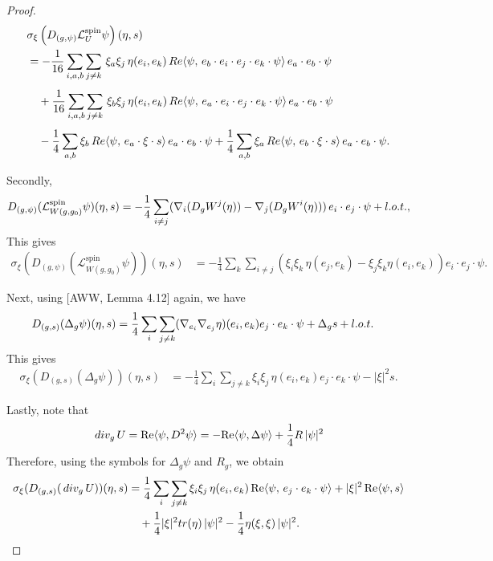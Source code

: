 \documentclass[10pt,a4paper]{amsart}
\renewcommand{\div}{\,\textup{div}}
\newcommand{\lot}{\textup{l.o.t.}}
\newcommand{\tr}{\textup{tr}}
\begin{document}
\begin{proof}
	\begin{align}
		&\sigma_{\xi}\left(D_{(g,\psi)}\mathcal{L}_{U}^{\text{spin}}\psi\right)(\eta,s)\\
		&= -\frac{1}{16}\sum_{i,a,b}\sum_{j\neq k}\, \xi_a\xi_j\, \eta(e_i, e_k)\, \textup{Re}\langle \psi,\, e_b\cdot e_i\cdot e_j\cdot e_k\cdot\psi\rangle \, e_a\cdot e_b\cdot \psi\\[1ex]
		&\quad  + \frac{1}{16}\sum_{i,a,b}\sum_{j\neq k}\, \xi_b\xi_j\, \eta (e_i, e_k)\, \textup{Re}\langle \psi,\, e_a\cdot e_i\cdot e_j\cdot e_k\cdot\psi\rangle \, e_a\cdot e_b\cdot\psi\\[1ex]
		&\quad -  \frac{1}{4}\sum_{a, b}\xi_b\, \textup{Re}\langle\psi,\, e_a\cdot \xi\cdot s\rangle \, e_a\cdot e_b\cdot \psi +  \frac{1}{4}\sum_{a, b} \xi_a\, \textup{Re}\langle\psi,\, e_b\cdot \xi\cdot s\rangle  \, e_a\cdot e_b\cdot \psi.
	\end{align}


Secondly,
\begin{align*}
	D_{(g,\psi)}(\mathcal{L}_{W(g,g_0)}^{\text{spin}}\psi)(\eta,s) =  -\frac{1}{4}\sum_{i\neq j}(\nabla_i (D_g W^j(\eta)) - \nabla_j (D_g W^i(\eta)))\, e_i\cdot e_j\cdot \psi + \lot,
\end{align*}
This gives
\begin{align*}
	\sigma_{\xi}(D_{(g,\psi)}(\mathcal{L}_{W(g,g_0) }^{\text{spin}}\psi))(\eta,s) &= -\frac{1}{4}\sum_k\sum_{i\neq j}(\xi_i\xi_k\,\eta(e_j, e_k) - \xi_j\xi_k\eta(e_i, e_k))e_i\cdot e_j\cdot \psi.
\end{align*}


Next, using [AWW, Lemma 4.12] again, we have
\begin{align*}
	D_{(g,s)}(\Delta_g\psi)(\eta,s) &= \frac{1}{4}\sum_i\sum_{j\neq k}(\nabla_{e_i}\nabla_{e_j}\eta)(e_i,e_k)e_j\cdot e_k\cdot\psi + \Delta_g s + \lot
\end{align*}
This gives
\begin{align*}
	\sigma_{\xi}(D_{(g,s)}(\Delta_g\psi))(\eta,s) &= -\frac{1}{4}\sum_i\sum_{j\neq k}\xi_i\xi_j\, \eta(e_i,e_k)e_j\cdot e_k\cdot\psi - |\xi|^2 s.
\end{align*}



Lastly, note that 
\begin{align*}
	\div_g\, U = \text{Re}\langle\psi, D^2\psi\rangle= -\text{Re}\langle\psi, \Delta\psi\rangle + \frac{1}{4}R \,|\psi|^2
\end{align*}
Therefore, using the symbols for $\Delta_g\psi$ and $R_g$, we obtain
\begin{align*}
	\sigma_{\xi}(D_{(g,s)}(\div_g\, U))(\eta,s) &=  \frac{1}{4}\sum_i\sum_{j\neq k}\xi_i\xi_j\, \eta(e_i,e_k)\, \text{Re}\langle\psi,\,e_j\cdot e_k\cdot\psi\rangle + |\xi|^2\,\text{Re}\langle\psi, s\rangle\\
	&\quad + \frac{1}{4}|\xi|^2\tr(\eta)\,|\psi|^2 -  \frac{1}{4}\eta(\xi,\xi)\,|\psi|^2.
\end{align*}
\end{proof}
\end{document}
